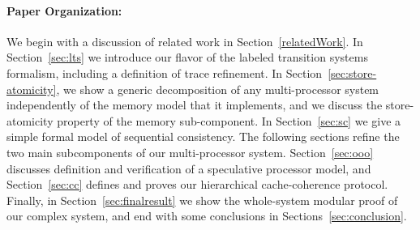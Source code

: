 \paragraph{Paper Organization:} We begin with a discussion of related work in
Section~\ref{relatedWork}. In Section~\ref{sec:lts} we introduce our flavor of
the labeled transition systems formalism, including a definition of trace
refinement. In Section~\ref{sec:store-atomicity}, we show a generic
decomposition of any multi-processor system independently of the memory model
that it implements, and we discuss the store-atomicity property of the memory
sub-component. In Section~\ref{sec:sc} we give a simple formal model of
sequential consistency.  The following sections refine the two main
subcomponents of our multi-processor system.  Section~\ref{sec:ooo} discusses
definition and verification of a speculative processor model, and
Section~\ref{sec:cc} defines and proves our hierarchical cache-coherence
protocol.  Finally, in Section~\ref{sec:finalresult} we show the whole-system
modular proof of our complex system, and end with some conclusions in
Sections~\ref{sec:conclusion}.




